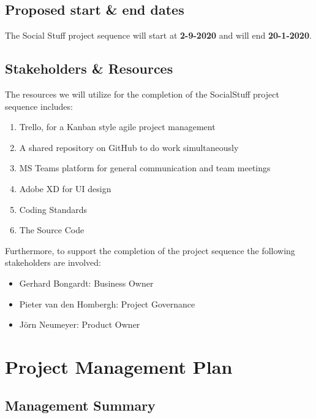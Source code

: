 \subsection{Proposed start \& end dates}\label{subsec:proposed-start-and-end-dates}

The Social Stuff project sequence will start at \textbf{2-9-2020} and will end \textbf{20-1-2020}.

\subsection{Stakeholders \& Resources}\label{subsec:stakeholders-and-resources}

The resources we will utilize for the completion of the SocialStuff project sequence includes:
\begin{enumerate}
    \item Trello, for a Kanban style agile project management
    \item A shared repository on GitHub to do work simultaneously
    \item MS Teams platform for general communication and team meetings
    \item Adobe XD for UI design
    \item Coding Standards
    \item The Source Code
\end{enumerate}

Furthermore, to support the completion of the project sequence the following stakeholders are involved:
\begin{itemize}
    \item Gerhard Bongardt: Business Owner
    \item Pieter van den Hombergh: Project Governance
    \item Jörn Neumeyer: Product Owner
\end{itemize}


\section{Project Management Plan}\label{sec:project-management-plan}

\subsection{Management Summary}\label{subsec:management-summary}

